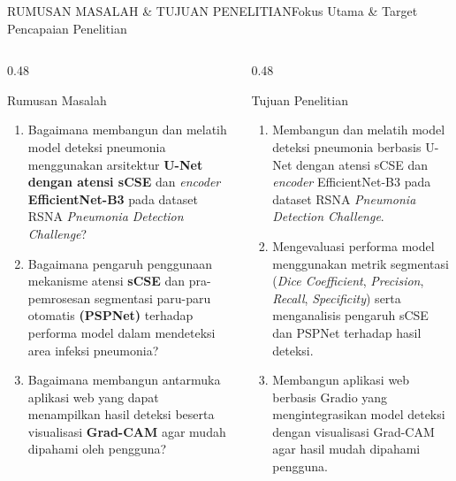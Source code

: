 \documentclass[aspectratio=169,11pt]{beamer}
\begin{document}
\begin{frame}{RUMUSAN MASALAH \& TUJUAN PENELITIAN}{Fokus Utama \& Target Pencapaian Penelitian}
\begin{columns}[T]
  \begin{column}{0.48\textwidth}
    \begin{block}{\footnotesize Rumusan Masalah}
      \begin{enumerate}\scriptsize
        \item Bagaimana membangun dan melatih model deteksi pneumonia menggunakan arsitektur \textbf{U-Net dengan atensi sCSE} dan \textit{encoder} \textbf{EfficientNet-B3} pada dataset RSNA \textit{Pneumonia Detection Challenge}?
        \item Bagaimana pengaruh penggunaan mekanisme atensi \textbf{sCSE} dan pra-pemrosesan segmentasi paru-paru otomatis \textbf{(PSPNet)} terhadap performa model dalam mendeteksi area infeksi pneumonia?
        \item Bagaimana membangun antarmuka aplikasi web yang dapat menampilkan hasil deteksi beserta visualisasi \textbf{Grad-CAM} agar mudah dipahami oleh pengguna?
      \end{enumerate}
    \end{block}
  \end{column}

  \begin{column}{0.48\textwidth}
    \begin{block}{\footnotesize Tujuan Penelitian}
      \begin{enumerate}\scriptsize
        \item Membangun dan melatih model deteksi pneumonia berbasis U-Net dengan atensi sCSE dan \textit{encoder} EfficientNet-B3 pada dataset RSNA \textit{Pneumonia Detection Challenge}.
        \item Mengevaluasi performa model menggunakan metrik segmentasi (\textit{Dice Coefficient}, \textit{Precision}, \textit{Recall}, \textit{Specificity}) serta menganalisis pengaruh sCSE dan PSPNet terhadap hasil deteksi.
        \item Membangun aplikasi web berbasis Gradio yang mengintegrasikan model deteksi dengan visualisasi Grad-CAM agar hasil mudah dipahami pengguna.
      \end{enumerate}
    \end{block}
  \end{column}
\end{columns}
\end{frame}
\end{document}
